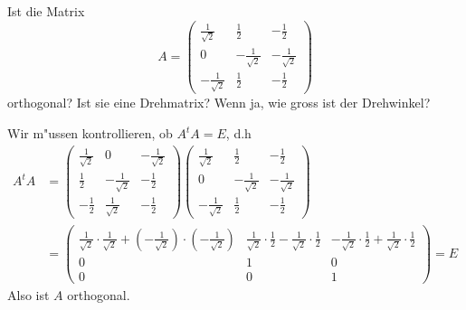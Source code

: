 Ist die Matrix
\[
A=
\begin{pmatrix}
\frac1{\sqrt{2}}&\frac12&-\frac12\\
0&-\frac1{\sqrt{2}}&-\frac1{\sqrt{2}}\\
-\frac1{\sqrt{2}}&\frac12&-\frac12
\end{pmatrix}
\]
orthogonal? Ist sie eine Drehmatrix?  Wenn ja, wie gross ist der Drehwinkel?

\begin{loesung}
Wir m"ussen kontrollieren, ob $A^tA=E$, d.h
\begin{align*}
A^tA&=
\begin{pmatrix}
\frac1{\sqrt{2}}&0&-\frac1{\sqrt{2}}\\
\frac12&-\frac1{\sqrt{2}}&-\frac12\\
-\frac12&\frac1{\sqrt{2}}&-\frac12
\end{pmatrix}
\begin{pmatrix}
\frac1{\sqrt{2}}&\frac12&-\frac12\\
0&-\frac1{\sqrt{2}}&-\frac1{\sqrt{2}}\\
-\frac1{\sqrt{2}}&\frac12&-\frac12
\end{pmatrix}
\\
&=
\begin{pmatrix}
\frac1{\sqrt{2}}\cdot\frac1{\sqrt{2}} + (-\frac1{\sqrt{2}})\cdot(-\frac1{\sqrt{2}})
        &\frac1{\sqrt{2}}\cdot\frac12-\frac1{\sqrt{2}}\cdot\frac12
                &-\frac1{\sqrt{2}}\cdot\frac12+\frac1{\sqrt{2}}\cdot\frac12\\
0&1&0\\
0&0&1
\end{pmatrix}=E
\end{align*}
Also ist $A$ orthogonal.


\end{loesung}

